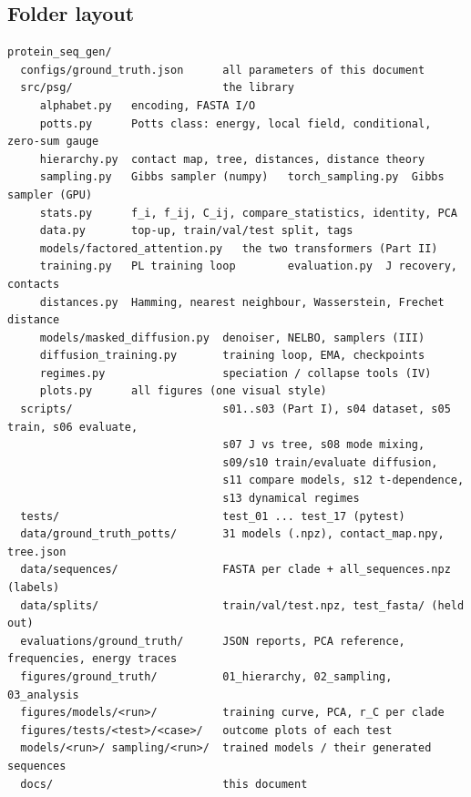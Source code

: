 \documentclass[11pt,a4paper]{article}
\begin{document}
\subsection{Folder layout}
{\small\begin{verbatim}
protein_seq_gen/
  configs/ground_truth.json      all parameters of this document
  src/psg/                       the library
     alphabet.py   encoding, FASTA I/O
     potts.py      Potts class: energy, local field, conditional, zero-sum gauge
     hierarchy.py  contact map, tree, distances, distance theory
     sampling.py   Gibbs sampler (numpy)   torch_sampling.py  Gibbs sampler (GPU)
     stats.py      f_i, f_ij, C_ij, compare_statistics, identity, PCA
     data.py       top-up, train/val/test split, tags
     models/factored_attention.py   the two transformers (Part II)
     training.py   PL training loop        evaluation.py  J recovery, contacts
     distances.py  Hamming, nearest neighbour, Wasserstein, Frechet distance
     models/masked_diffusion.py  denoiser, NELBO, samplers (III)
     diffusion_training.py       training loop, EMA, checkpoints
     regimes.py                  speciation / collapse tools (IV)
     plots.py      all figures (one visual style)
  scripts/                       s01..s03 (Part I), s04 dataset, s05 train, s06 evaluate,
                                 s07 J vs tree, s08 mode mixing,
                                 s09/s10 train/evaluate diffusion,
                                 s11 compare models, s12 t-dependence,
                                 s13 dynamical regimes
  tests/                         test_01 ... test_17 (pytest)
  data/ground_truth_potts/       31 models (.npz), contact_map.npy, tree.json
  data/sequences/                FASTA per clade + all_sequences.npz (labels)
  data/splits/                   train/val/test.npz, test_fasta/ (held out)
  evaluations/ground_truth/      JSON reports, PCA reference, frequencies, energy traces
  figures/ground_truth/          01_hierarchy, 02_sampling, 03_analysis
  figures/models/<run>/          training curve, PCA, r_C per clade
  figures/tests/<test>/<case>/   outcome plots of each test
  models/<run>/ sampling/<run>/  trained models / their generated sequences
  docs/                          this document
\end{verbatim}}
\end{document}
